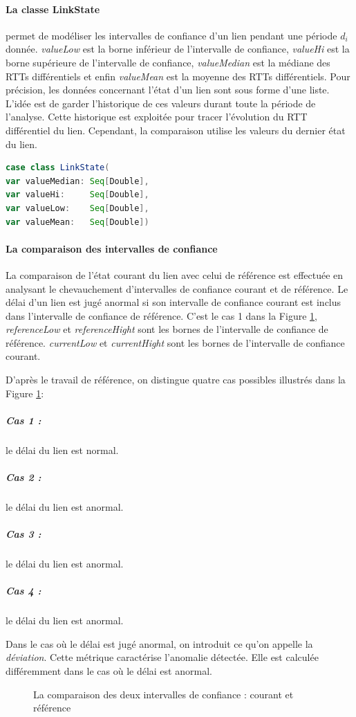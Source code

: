 \paragraph{La classe LinkState } permet de modéliser les intervalles de confiance d'un lien pendant une période $d_i$ donnée. \textit{valueLow} est la borne inférieur de l'intervalle de confiance, \textit{valueHi} est la borne supérieure de l'intervalle de confiance, \textit{valueMedian} est la médiane des RTTs différentiels et enfin \textit{valueMean} est la moyenne des RTTs différentiels. Pour précision, les données concernant l'état d'un lien sont sous forme d'une liste. L'idée est de garder l'historique de ces valeurs durant toute la période de l'analyse. Cette historique est exploitée pour tracer l'évolution du RTT différentiel du lien. Cependant, la comparaison utilise les valeurs du dernier état du lien.

  

\begin{lstlisting}[language=scala]
case class LinkState(
var valueMedian: Seq[Double],
var valueHi:     Seq[Double],
var valueLow:    Seq[Double],
var valueMean:   Seq[Double])
\end{lstlisting}
\paragraph{La comparaison des intervalles de confiance} 

La comparaison de l'état courant du lien avec celui de référence est effectuée en analysant le chevauchement d'intervalles de confiance  courant et de référence. Le délai d'un lien est jugé anormal si son intervalle de confiance courant est inclus dans l'intervalle de confiance de référence. C'est le cas 1 dans la Figure 	\ref{fig:intervals-comparaison},  \textit{referenceLow} et \textit{referenceHight} sont les bornes de l'intervalle de confiance de référence.  \textit{currentLow} et \textit{currentHight} sont les bornes de l'intervalle de confiance courant.

D'après le travail de référence, on distingue quatre cas possibles  illustrés dans la Figure 	\ref{fig:intervals-comparaison}:

\subparagraph{Cas 1 :} le délai du lien est normal.
\subparagraph{Cas 2 :} le délai du lien est anormal.
\subparagraph{Cas 3 :} le délai du lien est anormal.
\subparagraph{Cas 4 :} le délai du lien est anormal.

Dans le cas où le délai est jugé anormal, on introduit ce qu'on appelle la \textit{déviation}. Cette métrique caractérise l'anomalie détectée. Elle est calculée différemment dans le cas où le délai est anormal.

\begin{figure}[h]
	\centering
	\captionsetup{justification=centering}
	\resizebox{\textwidth}{!}{
	
}
	\caption{La comparaison des deux intervalles de confiance : courant et référence }
	\label{fig:intervals-comparaison}
\end{figure}

